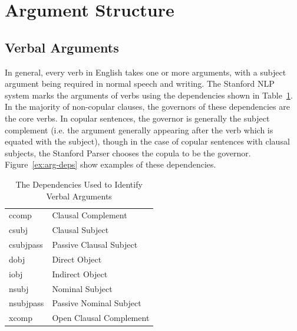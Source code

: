 \documentclass[main.tex]{subfiles}
\begin{document}
\section{Argument Structure}
\setcounter{section}{6}
\setcounter{table}{0}
\setcounter{figure}{0}

\subsection{Verbal Arguments}

In general, every verb in English takes one or more arguments, with a subject argument being required in normal speech and writing. The Stanford NLP system marks the arguments of verbs using the dependencies shown in Table~\ref{table:arg-deps}. In the majority of non-copular clauses, the governors of these dependencies are the core verbs. In copular sentences, the governor is generally the subject complement (i.e. the argument generally appearing after the verb which is equated with the subject), though in the case of copular sentences with clausal subjects, the Stanford Parser chooses the copula to be the governor.
Figure~\ref{ex:arg-deps} show examples of these dependencies.

\begin{table}[ht]
\small
\centering
\caption{The Dependencies Used to Identify Verbal Arguments}
\begin{tabular}{ l l }
\toprule
ccomp & Clausal Complement\\
csubj & Clausal Subject\\
csubjpass & Passive Clausal Subject\\
dobj & Direct Object\\
iobj & Indirect Object \\
nsubj & Nominal Subject\\
nsubjpass & Passive Nominal Subject\\
xcomp & Open Clausal Complement\\

\bottomrule
\end{tabular}
\label{table:arg-deps}
\end{table}
\end{document}
